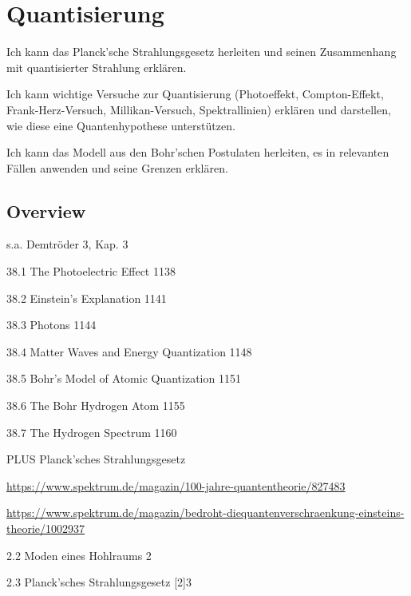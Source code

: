 \renewcommand{\lastmod}{10. September 2024}
\renewcommand{\chapterauthors}{Markus Lippitz}

\chapter{Quantisierung}




Ich kann das Planck’sche Strahlungsgesetz herleiten und seinen Zusammenhang mit quantisierter Strahlung erklären. 

Ich kann wichtige Versuche zur Quantisierung (Photoeffekt, Compton-Effekt, Frank-Herz-Versuch, Millikan-Versuch, Spektrallinien) erklären und darstellen, wie diese eine Quantenhypothese unterstützen. 

Ich kann das Modell aus den Bohr’schen Postulaten herleiten, es in relevanten Fällen anwenden und seine Grenzen erklären.

\section{Overview}

s.a. Demtröder 3, Kap. 3


38.1 The Photoelectric Effect 1138


38.2 Einstein's Explanation 1141

38.3 Photons 1144

38.4 Matter Waves and Energy Quantization 1148

38.5 Bohr's Model of Atomic Quantization 1151

38.6 The Bohr Hydrogen Atom 1155

38.7 The Hydrogen Spectrum 1160

PLUS Planck’sches Strahlungsgesetz


\url{https://www.spektrum.de/magazin/100-jahre-quantentheorie/827483}

\url{https://www.spektrum.de/magazin/bedroht-diequantenverschraenkung-einsteins-theorie/1002937}

2.2 Moden eines Hohlraums 2	

2.3 Planck’sches Strahlungsgesetz [2]3	

